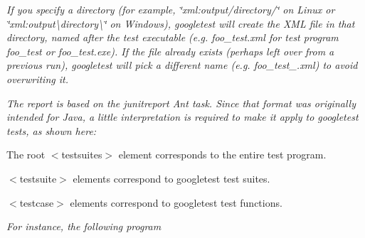 {\itshape If you specify a directory (for example, {\ttfamily \char`\"{}xml\+:output/directory/\char`\"{}} on Linux or {\ttfamily \char`\"{}xml\+:output\textbackslash{}directory\textbackslash{}\char`\"{}} on Windows), googletest will create the X\+ML file in that directory, named after the test executable (e.\+g. {\ttfamily foo\+\_\+test.\+xml} for test program {\ttfamily foo\+\_\+test} or {\ttfamily foo\+\_\+test.\+exe}). If the file already exists (perhaps left over from a previous run), googletest will pick a different name (e.\+g. {\ttfamily foo\+\_\+test\+\_.\+xml}) to avoid overwriting it.}

{\itshape The report is based on the {\ttfamily junitreport} Ant task. Since that format was originally intended for Java, a little interpretation is required to make it apply to googletest tests, as shown here\+:}

{\itshape 
\begin{DoxyCode}{0}
\DoxyCodeLine{      <\textcolor{keywordtype}{failure} \textcolor{keyword}{message}=\textcolor{stringliteral}{"..."}/>}
\DoxyCodeLine{      <\textcolor{keywordtype}{failure} \textcolor{keyword}{message}=\textcolor{stringliteral}{"..."}/>}
\DoxyCodeLine{      <\textcolor{keywordtype}{failure} \textcolor{keyword}{message}=\textcolor{stringliteral}{"..."}/>}
\DoxyCodeLine{    </\textcolor{keywordtype}{testcase}>}
\DoxyCodeLine{  </\textcolor{keywordtype}{testsuite}>}
\DoxyCodeLine{</\textcolor{keywordtype}{testsuites}>}
\end{DoxyCode}
}

{\itshape 
\begin{DoxyItemize}
\item The root {\ttfamily $<$testsuites$>$} element corresponds to the entire test program.
\item {\ttfamily $<$testsuite$>$} elements correspond to googletest test suites.
\item {\ttfamily $<$testcase$>$} elements correspond to googletest test functions.
\end{DoxyItemize}}

{\itshape For instance, the following program}

